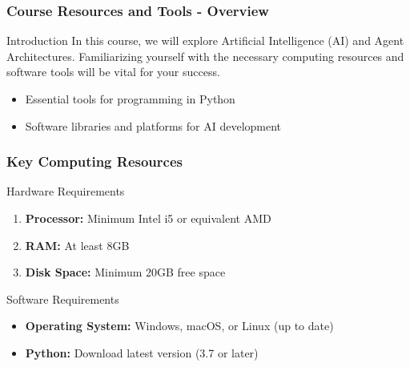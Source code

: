 \documentclass[aspectratio=169]{beamer}
\begin{document}
\begin{frame}[fragile]
    \frametitle{Course Resources and Tools - Overview}
    \begin{block}{Introduction}
        In this course, we will explore Artificial Intelligence (AI) and Agent Architectures. Familiarizing yourself with the necessary computing resources and software tools will be vital for your success. 
    \end{block}
    \begin{itemize}
        \item Essential tools for programming in Python
        \item Software libraries and platforms for AI development
    \end{itemize}
\end{frame}

\begin{frame}[fragile]
    \frametitle{Key Computing Resources}
    \begin{block}{Hardware Requirements}
        \begin{enumerate}
            \item \textbf{Processor:} Minimum Intel i5 or equivalent AMD 
            \item \textbf{RAM:} At least 8GB
            \item \textbf{Disk Space:} Minimum 20GB free space 
        \end{enumerate}
    \end{block}
    \begin{block}{Software Requirements}
        \begin{itemize}
            \item \textbf{Operating System:} Windows, macOS, or Linux (up to date)
            \item \textbf{Python:} Download latest version (3.7 or later)
        \end{itemize}
    \end{block}
\end{frame}
\end{document}
